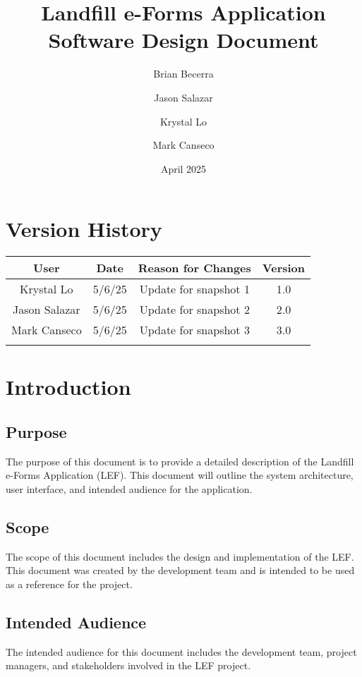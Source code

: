 \documentclass[12pt]{article}
\title{Landfill e-Forms Application\\
Software Design Document}
\author{
    Brian Becerra\\
    \and
    Jason Salazar\\
    \and
    Krystal Lo\\
    \and
    Mark Canseco\\
    }
\date{April 2025}
\begin{document}
\begin{titlepage}
\maketitle
\thispagestyle{empty}
\end{titlepage}

\thispagestyle{empty}
\tableofcontents
\newpage

\section*{Version History}
\begin{table}[ht]
    \centering
    \begin{tabular}{|c|c|c|c|}
    \hline
    \textbf{User} & \textbf{Date} & \textbf{Reason for Changes} & \textbf{Version}\\
    \hline
         Krystal Lo &  5/6/25 &  Update for snapshot 1 & 1.0 \\
    \hline
         Jason Salazar & 5/6/25 & Update for snapshot 2 & 2.0\\
    \hline
         Mark Canseco & 5/6/25 & Update for snapshot 3 & 3.0\\
    \hline
         &  &  & \\
    \hline
    \end{tabular}
\end{table}
\newpage

\section{Introduction}
\subsection{Purpose}
The purpose of this document is to provide a detailed description of the Landfill e-Forms Application (LEF). This document will outline the system architecture, user interface, and intended audience for the application.
\subsection{Scope}
The scope of this document includes the design and implementation of the LEF. This document was created by the development team and is intended to be used as a reference for the project.
\subsection{Intended Audience}
The intended audience for this document includes the development team, project managers, and stakeholders involved in the LEF project. 
\end{document}

